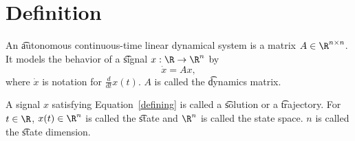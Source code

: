 

\section*{Definition}

An \t{autonomous continuous-time linear dynamical system} is a matrix $A \in \R ^{n \times  n}$.
It models the behavior of a \t{signal} $x: \R  \to \R ^n$ by
\begin{equation}
    \label{defining}\dot{x} = Ax,\end{equation}
where $\dot{x}$ is notation for $\frac{d}{dt} x(t)$.
$A$ is called the \t{dynamics matrix}.

A signal $x$ satisfying Equation~\eqref{defining} is called a \t{solution} or a \t{trajectory}.
For $t \in \R $, $x(t) \in \R ^n$ is called the \t{state} and $\R ^n$ is called the state space.
$n$ is called the \t{state dimension}.

\blankpage